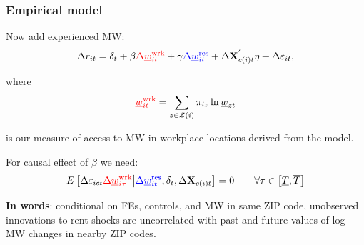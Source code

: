 \documentclass[aspectratio=169, t]{beamer}
\newcommand{\Z}{\mathcal{Z}}
\newcommand{\MW}{\underline{w}}
\begin{document}
\begin{frame}
    \frametitle{Empirical model}
        
    Now add experienced MW:
    $$
    \Delta r_{it} = \delta_t +
        \beta {\color{red}\Delta \MW^{\text{wrk}}_{it}} +
        \gamma {\color{blue} \Delta \MW^{\text{res}}_{it}} + 
        \Delta \mathbf{X}^{'}_{c(i)t} \eta + 
        \Delta \varepsilon_{it} ,
    $$
    
    where 
    \[
    {\color{red} \MW^{\text{wrk}}_{it}} = 
        \sum_{z \in \Z(i)} \pi_{i z} \ln \underline{w}_{zt}
    \] 
    
    is our measure of access to MW in workplace locations derived from the model.


    \pause
    \vspace{2mm}
    For causal effect of $\beta$ we need:
    $$
    E \left[\Delta \varepsilon_{ict} {\color{red} \Delta 
    \MW^{\text{wrk}}_{i\tau}} 
    \big| {\color{blue}\Delta \MW^{\text{res}}_{it}}, \delta_t, \Delta 
    \mathbf{X}_{c(i)t} \right] = 0
    \quad \quad \forall \tau \in \left[ \underline{T}, \overline{T} \right]
    $$
    
    \pause
    \vspace{2mm}
    \textbf{In words}: conditional on FEs, controls, and {\color{blue} MW in same ZIP 
    code}, unobserved innovations to rent shocks are uncorrelated with past and future 
    values of log MW changes {\color{red} in nearby ZIP codes}.
\end{frame}
\end{document}
